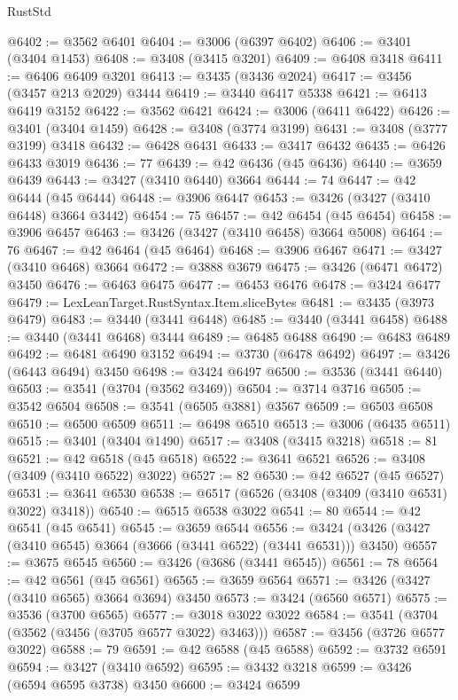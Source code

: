 \begin{lexlean}{RustStd}
\begin{coremodule}
@6402 := @3562 @6401
@6404 := @3006 (@6397 @6402)
@6406 := @3401 (@3404 @1453)
@6408 := @3408 (@3415 @3201)
@6409 := @6408 @3418
@6411 := @6406 @6409 @3201
@6413 := @3435 (@3436 @2024)
@6417 := @3456 (@3457 @213 @2029) @3444
@6419 := @3440 @6417 @5338
@6421 := @6413 @6419 @3152
@6422 := @3562 @6421
@6424 := @3006 (@6411 @6422)
@6426 := @3401 (@3404 @1459)
@6428 := @3408 (@3774 @3199)
@6431 := @3408 (@3777 @3199) @3418
@6432 := @6428 @6431
@6433 := @3417 @6432
@6435 := @6426 @6433 @3019
@6436 := 77
@6439 := @42 @6436 (@45 @6436)
@6440 := @3659 @6439
@6443 := @3427 (@3410 @6440) @3664
@6444 := 74
@6447 := @42 @6444 (@45 @6444)
@6448 := @3906 @6447
@6453 := @3426 (@3427 (@3410 @6448) @3664 @3442)
@6454 := 75
@6457 := @42 @6454 (@45 @6454)
@6458 := @3906 @6457
@6463 := @3426 (@3427 (@3410 @6458) @3664 @5008)
@6464 := 76
@6467 := @42 @6464 (@45 @6464)
@6468 := @3906 @6467
@6471 := @3427 (@3410 @6468) @3664
@6472 := @3888 @3679
@6475 := @3426 (@6471 @6472) @3450
@6476 := @6463 @6475
@6477 := @6453 @6476
@6478 := @3424 @6477
@6479 := LexLeanTarget.RustSyntax.Item.sliceBytes
@6481 := @3435 (@3973 @6479)
@6483 := @3440 (@3441 @6448)
@6485 := @3440 (@3441 @6458)
@6488 := @3440 (@3441 @6468) @3444
@6489 := @6485 @6488
@6490 := @6483 @6489
@6492 := @6481 @6490 @3152
@6494 := @3730 (@6478 @6492)
@6497 := @3426 (@6443 @6494) @3450
@6498 := @3424 @6497
@6500 := @3536 (@3441 @6440)
@6503 := @3541 (@3704 (@3562 @3469))
@6504 := @3714 @3716
@6505 := @3542 @6504
@6508 := @3541 (@6505 @3881) @3567
@6509 := @6503 @6508
@6510 := @6500 @6509
@6511 := @6498 @6510
@6513 := @3006 (@6435 @6511)
@6515 := @3401 (@3404 @1490)
@6517 := @3408 (@3415 @3218)
@6518 := 81
@6521 := @42 @6518 (@45 @6518)
@6522 := @3641 @6521
@6526 := @3408 (@3409 (@3410 @6522) @3022)
@6527 := 82
@6530 := @42 @6527 (@45 @6527)
@6531 := @3641 @6530
@6538 := @6517 (@6526 (@3408 (@3409 (@3410 @6531) @3022) @3418))
@6540 := @6515 @6538 @3022
@6541 := 80
@6544 := @42 @6541 (@45 @6541)
@6545 := @3659 @6544
@6556 := @3424 (@3426 (@3427 (@3410 @6545) @3664 (@3666 (@3441 @6522) (@3441 @6531))) @3450)
@6557 := @3675 @6545
@6560 := @3426 (@3686 (@3441 @6545))
@6561 := 78
@6564 := @42 @6561 (@45 @6561)
@6565 := @3659 @6564
@6571 := @3426 (@3427 (@3410 @6565) @3664 @3694) @3450
@6573 := @3424 (@6560 @6571)
@6575 := @3536 (@3700 @6565)
@6577 := @3018 @3022 @3022
@6584 := @3541 (@3704 (@3562 (@3456 (@3705 @6577 @3022) @3463)))
@6587 := @3456 (@3726 @6577 @3022)
@6588 := 79
@6591 := @42 @6588 (@45 @6588)
@6592 := @3732 @6591
@6594 := @3427 (@3410 @6592)
@6595 := @3432 @3218
@6599 := @3426 (@6594 @6595 @3738) @3450
@6600 := @3424 @6599

\end{coremodule}
\end{lexlean}
